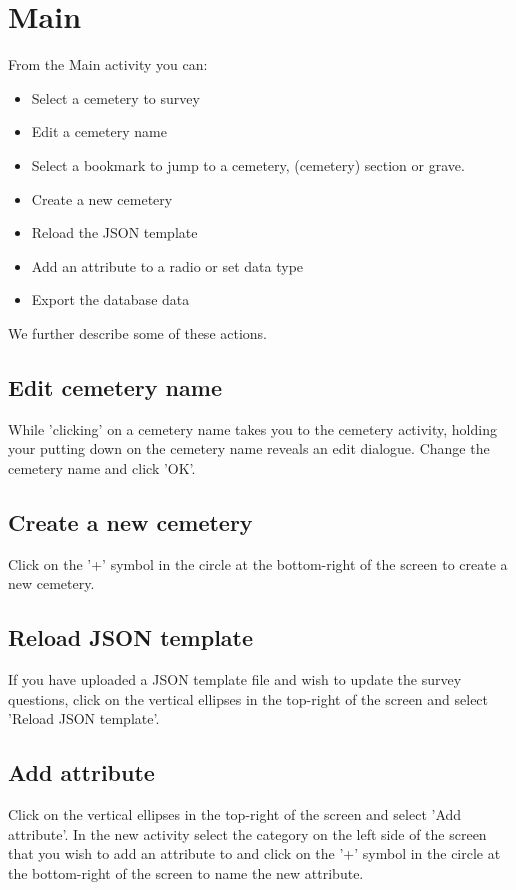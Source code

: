 \documentclass{scrreprt}
\begin{document}
\section{Main}
From the Main activity you can:
\begin{itemize}
\item Select a cemetery to survey
\item Edit a cemetery name
\item Select a bookmark to jump to a cemetery, (cemetery) section or grave.
\item Create a new cemetery
\item Reload the JSON template
\item Add an attribute to a radio or set data type
\item Export the database data
\end{itemize}

We further describe some of these actions.

\subsection{Edit cemetery name}
While 'clicking' on a cemetery name takes you to the cemetery activity, holding your putting down on the cemetery name reveals an edit dialogue. Change the cemetery name and click 'OK'.

\subsection{Create a new cemetery}
Click on the '+' symbol in the circle at the bottom-right of the screen to create a new cemetery.

\subsection{Reload JSON template}
If you have uploaded a JSON template file and wish to update the survey questions, click on the vertical ellipses in the top-right of the screen and select 'Reload JSON template'.

\subsection{Add attribute}
Click on the vertical ellipses in the top-right of the screen and select 'Add attribute'. In the new activity select the category on the left side of the screen that you wish to add an attribute to and click on the '+' symbol in the circle at the bottom-right of the screen to name the new attribute.
\end{document}
